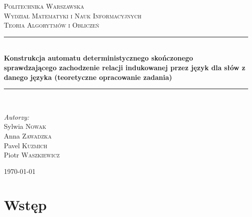 \documentclass{llncs}
\begin{document}
	
\begin{titlepage}

\newcommand{\HRule}{\rule{\linewidth}{0.5mm}}

\center


\textsc{\LARGE Politechnika Warszawska}\\[5mm]
\textsc{\LARGE Wydział Matematyki i Nauk Informacyjnych}\\[4cm]
 

\textsc{\Large Teoria Algorytmów i Obliczeń}\\[0.5cm]


\HRule \\[0.4cm]
{ \huge \bfseries Konstrukcja automatu deterministycznego skończonego sprawdzającego zachodzenie relacji indukowanej przez język dla słów z danego języka (teoretyczne opracowanie zadania)}\\[0.4cm]
\HRule \\[1.5cm]
 

\begin{flushright}
\Large \emph{Autorzy:}\\[0.5cm]
Sylwia \textsc{Nowak}\\
Anna \textsc{Zawadzka}\\
Pavel \textsc{Kuzmich}\\
Piotr \textsc{Waszkiewicz}\\
\end{flushright}


\vfill
{\large \today}\\[3cm]

\end{titlepage}
	
\tableofcontents
\newpage

\section{Wstęp}
\end{document}
